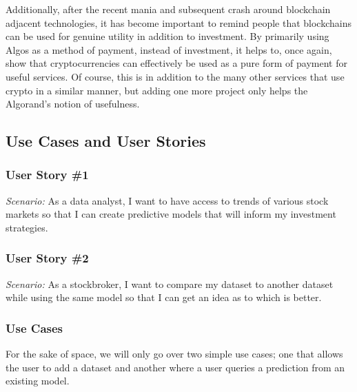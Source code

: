 \documentclass{article}
\begin{document}
    Additionally, after the recent mania and subsequent crash around blockchain adjacent technologies, it has become
    important to remind people that blockchains can be used for genuine utility in addition to investment.  By primarily
    using Algos as a method of payment, instead of investment, it helps to, once again, show that cryptocurrencies can
    effectively be used as a pure form of payment for useful services.  Of course, this is in addition to the many other
    services that use crypto in a similar manner, but adding one more project only helps the Algorand's notion of usefulness.


    \subsection{Use Cases and User Stories}

    \subsubsection*{User Story \#1}
    \textit{Scenario:} As a data analyst, I want to have access to trends of various stock markets so that I can create
    predictive models that will inform my investment strategies.

    \subsubsection*{User Story \#2}
    \textit{Scenario:} As a stockbroker, I want to compare my dataset to another dataset while using the same model so that
    I can get an idea as to which is better.

    \subsubsection*{Use Cases}
    For the sake of space, we will only go over two simple use cases; one that allows the user to add a dataset and
    another where a user queries a prediction from an existing model.
\end{document}
